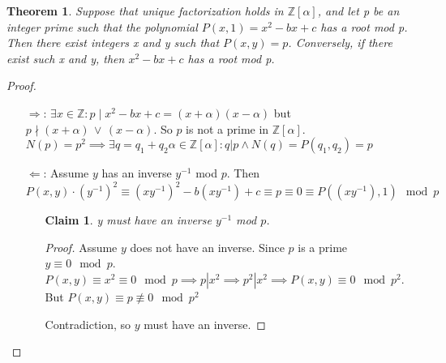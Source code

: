 \documentclass{article}
\newtheorem*{thm}{Theorem}
\newtheorem{claim}{Claim}
\theoremstyle{definition}\newtheorem{definition}{Definition}
\begin{document}
\begin{thm}
	Suppose that unique factorization holds in $\mathbb { Z } [ \alpha ]$, and let p be an integer prime such that the polynomial $P ( x , 1 ) = x ^ { 2 } - b x + c$ has a root mod p. Then there exist integers x and y such that $P (x, y) = p$. Conversely, if there exist such x and y, then $x^2 - bx + c$ has a root mod p.
\end{thm}	
\begin{proof}
\
	\begin{itemize}
		\item[$\Rightarrow$:]$\exists x \in \mathbb Z : p \mid x ^ { 2 } - b x + c = (x+\alpha)(x-\alpha)$ but $p \nmid (x+\alpha)\, \lor \,(x-\alpha)$. So $p$ is not a prime in $\mathbb { Z } [ \alpha ]$. $N(p)=p^2 \implies \exists q = q_1+ q_2 \alpha \in \mathbb { Z } [ \alpha ] : q|p \land N(q)=P(q_1,q_2)=p$
		\item[$\Leftarrow$:] Assume $y$ has an inverse $y^{-1}$ mod $p$. Then 
		$$P (x, y)\cdot (y^{-1})^2 \equiv (xy^{-1})^2 -b(xy^{-1}) + c\equiv p  \equiv 0 \equiv P ((xy^{-1}), 1) \mod p$$
		\begin{itemize}
			\item[] 
				\begin{claim} y must have an inverse $y^{-1}$ mod $p$.
				\end{claim}
				\begin{proof}\renewcommand{\qedsymbol}{$\blacksquare$}
				Assume $y$ does not have an inverse. Since $p$ is a prime $y \equiv 0 \mod p$. $P(x,y)\equiv x^2 \equiv 0 \mod p \implies p|x^2 \implies p^2|x^2 \implies P(x,y)\equiv 0 \mod p^2$. But $P(x,y)\equiv p \not\equiv 0 \mod p^2$ 
				
				Contradiction, so $y$ must have an inverse.
				\end{proof}
		\end{itemize}
	\end{itemize}
\end{proof}
\end{document}
